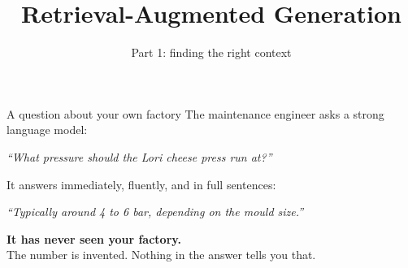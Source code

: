\documentclass[aspectratio=169]{beamer}
\title{Retrieval-Augmented Generation}
\subtitle{Part 1: finding the right context}
\author{}
\date{}
\begin{document}
\begin{frame}[plain]
  \titlepage
\end{frame}

\begin{frame}{A question about your own factory}
  \vspace{0.4em}
  The maintenance engineer asks a strong language model:

  \vspace{0.8em}
  \begin{center}
  \begin{tcolorbox}[colback=lightbg, colframe=gray, boxrule=0.5pt, arc=2pt, width=0.86\textwidth]
    \textit{``What pressure should the Lori cheese press run at?''}
  \end{tcolorbox}
  \end{center}

  \vspace{0.4em}
  It answers immediately, fluently, and in full sentences:

  \vspace{0.6em}
  \begin{center}
  \begin{tcolorbox}[colback=armred!8, colframe=armred, boxrule=0.6pt, arc=2pt, width=0.86\textwidth]
    \textit{``Typically around 4 to 6 bar, depending on the mould size.''}
  \end{tcolorbox}
  \end{center}

  \vspace{0.5em}
  \begin{center}
  {\large\color{armred}\textbf{It has never seen your factory.}}\\[0.2em]
  {\small The number is invented. Nothing in the answer tells you that.}
  \end{center}
\end{frame}
\end{document}
